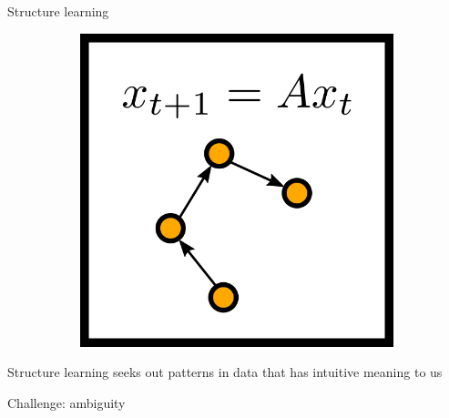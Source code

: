 \documentclass[10pt, compress]{beamer}
\begin{document}
\begin{frame}{Structure learning}
\begin{figure}
\begin{subfigure}[t]{0.27\textwidth}
    \end{subfigure}
    \pause
    \hfill
    \begin{subfigure}[t]{0.27\textwidth}
        \centering
        \includegraphics[width=\textwidth]{img/lds}
    \end{subfigure}
  \end{figure}
  \pause
  Structure learning seeks out patterns in data that has intuitive meaning to us

\end{frame}

\begin{frame}{Challenge: ambiguity}
  \centering
  
  

\end{frame}
\end{document}
